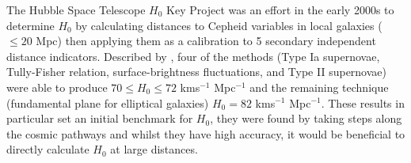 \documentclass[12pt, onecolumn]{revtex4}    %
\begin{document}
The Hubble Space Telescope $H_0$ Key Project was an effort in the early 2000s to determine $H_0$ by calculating distances to Cepheid variables in local galaxies ($\le 20$ Mpc) then applying them as a calibration to 5 secondary independent distance indicators. Described by \cite{freedman_hstkeystone}, four of the methods (Type Ia supernovae, Tully-Fisher relation, surface-brightness fluctuations, and Type II supernovae) were able to produce $70\le H_0 \le72$ kms$^{-1}$ Mpc$^{-1}$ and the remaining technique (fundamental plane for elliptical galaxies) $H_0=82$ kms$^{-1}$ Mpc$^{-1}$. These results in particular set an initial benchmark for $H_0$, they were found by taking steps along the cosmic pathways and whilst they have high accuracy, it would be beneficial to directly calculate $H_0$ at large distances. \\





\newpage





\newpage
\end{document}
